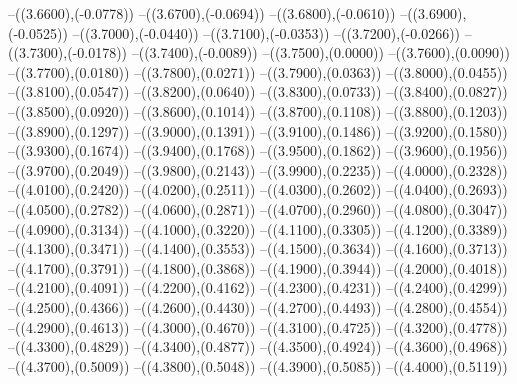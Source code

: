 {	--({\sx*(3.6600)},{\sy*(-0.0778)})
	--({\sx*(3.6700)},{\sy*(-0.0694)})
	--({\sx*(3.6800)},{\sy*(-0.0610)})
	--({\sx*(3.6900)},{\sy*(-0.0525)})
	--({\sx*(3.7000)},{\sy*(-0.0440)})
	--({\sx*(3.7100)},{\sy*(-0.0353)})
	--({\sx*(3.7200)},{\sy*(-0.0266)})
	--({\sx*(3.7300)},{\sy*(-0.0178)})
	--({\sx*(3.7400)},{\sy*(-0.0089)})
	--({\sx*(3.7500)},{\sy*(0.0000)})
	--({\sx*(3.7600)},{\sy*(0.0090)})
	--({\sx*(3.7700)},{\sy*(0.0180)})
	--({\sx*(3.7800)},{\sy*(0.0271)})
	--({\sx*(3.7900)},{\sy*(0.0363)})
	--({\sx*(3.8000)},{\sy*(0.0455)})
	--({\sx*(3.8100)},{\sy*(0.0547)})
	--({\sx*(3.8200)},{\sy*(0.0640)})
	--({\sx*(3.8300)},{\sy*(0.0733)})
	--({\sx*(3.8400)},{\sy*(0.0827)})
	--({\sx*(3.8500)},{\sy*(0.0920)})
	--({\sx*(3.8600)},{\sy*(0.1014)})
	--({\sx*(3.8700)},{\sy*(0.1108)})
	--({\sx*(3.8800)},{\sy*(0.1203)})
	--({\sx*(3.8900)},{\sy*(0.1297)})
	--({\sx*(3.9000)},{\sy*(0.1391)})
	--({\sx*(3.9100)},{\sy*(0.1486)})
	--({\sx*(3.9200)},{\sy*(0.1580)})
	--({\sx*(3.9300)},{\sy*(0.1674)})
	--({\sx*(3.9400)},{\sy*(0.1768)})
	--({\sx*(3.9500)},{\sy*(0.1862)})
	--({\sx*(3.9600)},{\sy*(0.1956)})
	--({\sx*(3.9700)},{\sy*(0.2049)})
	--({\sx*(3.9800)},{\sy*(0.2143)})
	--({\sx*(3.9900)},{\sy*(0.2235)})
	--({\sx*(4.0000)},{\sy*(0.2328)})
	--({\sx*(4.0100)},{\sy*(0.2420)})
	--({\sx*(4.0200)},{\sy*(0.2511)})
	--({\sx*(4.0300)},{\sy*(0.2602)})
	--({\sx*(4.0400)},{\sy*(0.2693)})
	--({\sx*(4.0500)},{\sy*(0.2782)})
	--({\sx*(4.0600)},{\sy*(0.2871)})
	--({\sx*(4.0700)},{\sy*(0.2960)})
	--({\sx*(4.0800)},{\sy*(0.3047)})
	--({\sx*(4.0900)},{\sy*(0.3134)})
	--({\sx*(4.1000)},{\sy*(0.3220)})
	--({\sx*(4.1100)},{\sy*(0.3305)})
	--({\sx*(4.1200)},{\sy*(0.3389)})
	--({\sx*(4.1300)},{\sy*(0.3471)})
	--({\sx*(4.1400)},{\sy*(0.3553)})
	--({\sx*(4.1500)},{\sy*(0.3634)})
	--({\sx*(4.1600)},{\sy*(0.3713)})
	--({\sx*(4.1700)},{\sy*(0.3791)})
	--({\sx*(4.1800)},{\sy*(0.3868)})
	--({\sx*(4.1900)},{\sy*(0.3944)})
	--({\sx*(4.2000)},{\sy*(0.4018)})
	--({\sx*(4.2100)},{\sy*(0.4091)})
	--({\sx*(4.2200)},{\sy*(0.4162)})
	--({\sx*(4.2300)},{\sy*(0.4231)})
	--({\sx*(4.2400)},{\sy*(0.4299)})
	--({\sx*(4.2500)},{\sy*(0.4366)})
	--({\sx*(4.2600)},{\sy*(0.4430)})
	--({\sx*(4.2700)},{\sy*(0.4493)})
	--({\sx*(4.2800)},{\sy*(0.4554)})
	--({\sx*(4.2900)},{\sy*(0.4613)})
	--({\sx*(4.3000)},{\sy*(0.4670)})
	--({\sx*(4.3100)},{\sy*(0.4725)})
	--({\sx*(4.3200)},{\sy*(0.4778)})
	--({\sx*(4.3300)},{\sy*(0.4829)})
	--({\sx*(4.3400)},{\sy*(0.4877)})
	--({\sx*(4.3500)},{\sy*(0.4924)})
	--({\sx*(4.3600)},{\sy*(0.4968)})
	--({\sx*(4.3700)},{\sy*(0.5009)})
	--({\sx*(4.3800)},{\sy*(0.5048)})
	--({\sx*(4.3900)},{\sy*(0.5085)})
	--({\sx*(4.4000)},{\sy*(0.5119)})
}
